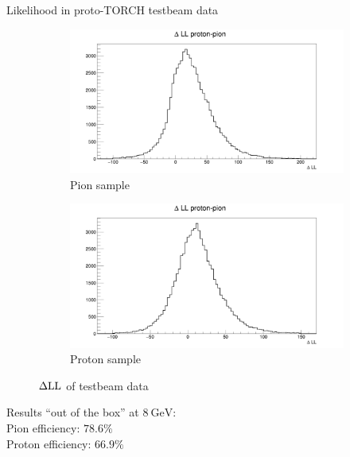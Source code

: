 \documentclass{beamer}
\begin{document}
\begin{frame}{Likelihood in proto-TORCH testbeam data}
  \begin{figure}
    \centering
    \vspace{-0.2cm}
    \begin{subfigure}{0.5\textwidth}
      \includegraphics[width = 1.0\textwidth]{Plots/TestBeamDLLPion.png}
      \caption{Pion sample}
    \end{subfigure}%
    \begin{subfigure}{0.5\textwidth}
      \includegraphics[width = 1.0\textwidth]{Plots/TestBeamDLLProton.png}
      \caption{Proton sample}
    \end{subfigure}
    \caption{$\Delta{\rm LL}$ of testbeam data}
  \end{figure}
  \begin{center}
    \large Results ``out of the box'' at $\SI{8}{\giga\eV}$: \\
    \large Pion efficiency: $78.6\%$ \\
    \large Proton efficiency: $66.9\%$
  \end{center}
\end{frame}
\end{document}
